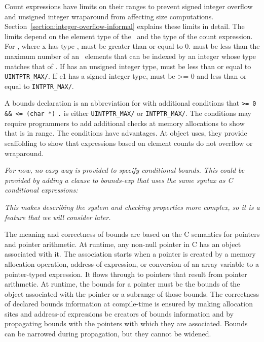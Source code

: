 Count expressions have limits on their ranges to prevent signed integer
overflow and unsigned integer wraparound from affecting size
computations. Section~\ref{section:integer-overflow-informal}
explains these limits in detail. The limits
depend on the element type of the \arrayptr\ and the type of the count
expression. For , where x
has type \arrayptrT ,
 must be greater than or equal to 0.  must be less
than the maximum number of an
\arrayptrT\ elements
that can be indexed by an integer whose type matches that of .
If  has an unsigned integer type,  must be less than
or equal to \texttt{UINTPTR\_MAX/}. If e1 has a
signed integer type,  must be \textgreater{}= 0 and less than
or equal to \texttt{INTPTR\_MAX/}.

A bounds declaration  is an
abbreviation for  with additional conditions that 
\texttt{>= 0 \&\&  <= (char *)}
\texttt{.}  is either
\texttt{UINTPTR\_MAX/} or
\texttt{INTPTR\_MAX/}. The conditions may
require programmers to add additional checks at memory allocations to
show that  is in range. The conditions have advantages. At
object uses, they provide scaffolding to show that expressions based on
element counts do not overflow or wraparound.

\emph{For now, no easy way is provided to specify conditional bounds.
This could be provided by adding a clause to bounds-exp that uses the
same syntax as C conditional expressions: }


\begin{quote}
\end{quote}

\emph{This makes describing the system and checking properties more
complex, so it is a feature that we will consider later.}

The meaning and correctness of bounds are based on the C semantics for
pointers and pointer arithmetic. At runtime, any non-null pointer in C
has an object associated with it. The association starts when a pointer
is created by a memory allocation operation, address-of expression, or
conversion of an array variable to a pointer-typed expression. It flows
through to pointers that result from pointer arithmetic. At runtime, the
bounds for a pointer must be the bounds of the object associated with
the pointer or a subrange of those bounds. The correctness of declared
bounds information at compile-time is ensured by making allocation sites
and address-of expressions be creators of bounds information and by
propagating bounds with the pointers with which they are associated.
Bounds can be narrowed during propagation, but they cannot be widened.

